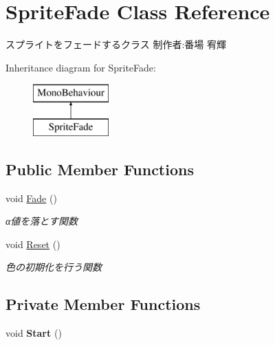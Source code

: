\hypertarget{class_sprite_fade}{}\section{Sprite\+Fade Class Reference}
\label{class_sprite_fade}


スプライトをフェードするクラス 制作者\+:番場 宥輝  


Inheritance diagram for Sprite\+Fade\+:\begin{figure}[H]
\begin{center}
\leavevmode
\includegraphics[height=2.000000cm]{class_sprite_fade}
\end{center}
\end{figure}
\subsection*{Public Member Functions}
\begin{DoxyCompactItemize}
\item 
void \hyperlink{class_sprite_fade_acf3e6391bf02c5f324e73b21856533b9}{Fade} ()
\begin{DoxyCompactList}\small\item\em α値を落とす関数 \end{DoxyCompactList}\item 
void \hyperlink{class_sprite_fade_ad53e994f9ff104a538660e50bf6491ed}{Reset} ()
\begin{DoxyCompactList}\small\item\em 色の初期化を行う関数 \end{DoxyCompactList}\end{DoxyCompactItemize}
\subsection*{Private Member Functions}
\begin{DoxyCompactItemize}
\item 
\mbox{\label{class_sprite_fade_a692446031a54057ada819bd2212ca270}} 
void {\bfseries Start} ()
\end{DoxyCompactItemize}
